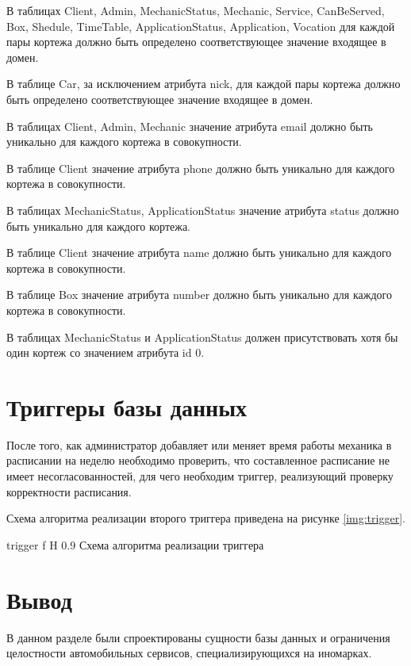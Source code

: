 В таблицах Client, Admin, MechanicStatus, Mechanic, Service, CanBeServed, Box, Shedule, TimeTable, ApplicationStatus, Application, Vocation для каждой пары кортежа должно быть определено соответствующее значение входящее в домен. 

В таблице Car, за исключением атрибута nick, для каждой пары кортежа должно быть определено соответствующее значение входящее в домен.

В таблицах Client, Admin, Mechanic значение атрибута email должно быть уникально для каждого кортежа в совокупности.

В таблице Client значение атрибута phone должно быть уникально для каждого кортежа в совокупности.

В таблицах MechanicStatus, ApplicationStatus значение атрибута status должно быть уникально для каждого кортежа.

В таблице Client значение атрибута name должно быть уникально для каждого кортежа в совокупности.

В таблице Box значение атрибута number должно быть уникально для каждого кортежа в совокупности.

В таблицах MechanicStatus и ApplicationStatus должен присутствовать хотя бы один кортеж со значением атрибута id 0. 

\section{Триггеры базы данных}

После того, как администратор добавляет или меняет время работы механика в расписании на неделю необходимо проверить, что составленное расписание не имеет несогласованностей, для чего необходим триггер, реализующий проверку корректности расписания.

Схема алгоритма реализации второго триггера приведена на рисунке \ref{img:trigger}.

{trigger}
{f}
{H}
{0.9\textwidth}
{Схема алгоритма реализации триггера}

\section*{Вывод}

В данном разделе были спроектированы сущности базы данных и ограничения целостности автомобильных сервисов, специализирующихся на иномарках.


 



